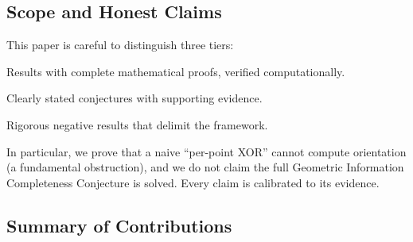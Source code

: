 \documentclass[11pt,letterpaper]{article}
\begin{document}
\subsection{Scope and Honest Claims}

This paper is careful to distinguish three tiers:

\begin{description}[leftmargin=2em]
\item[Proved.] Results with complete mathematical proofs, verified computationally.
\item[Open (conjectured).] Clearly stated conjectures with supporting evidence.
\item[Impossible.] Rigorous negative results that delimit the framework.
\end{description}

In particular, we prove that a naive ``per-point XOR'' cannot compute orientation (a
fundamental obstruction), and we do not claim the full Geometric Information Completeness
Conjecture is solved.  Every claim is calibrated to its evidence.

\subsection{Summary of Contributions}
\end{document}
